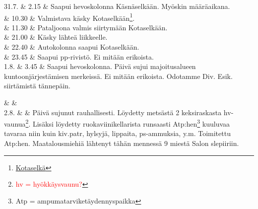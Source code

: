 \documentclass[11pt,a5paper,oneside]{book}
\begin{document}
\taulustop


31.7. & 2.15 & Saapui hevoskolonna Käsnäselkään. Myöskin määräaikana. \newline \\

& 10.30 & Valmistava käsky Kotaselkään\footnote{\href{https://www.google.fi/maps/place/61\%C2\%B031'09.9\%22N+32\%C2\%B033'31.8\%22E/}{Kotaselkä}}. \\

& 11.30 & Pataljoona valmis siirtymään Kotaselkään. \newline \\

& 21.00 & Käsky lähteä liikkeelle. \\

& 22.40 & Autokolonna saapui Kotaselkään. \\

& 23.45 & Saapui pp-rivistö. \newline Ei mitään erikoista. \newline\newline\newline\newline\newline\newline \\

1.8. & 3.45 & Saapui hevoskolonna. \newline Päivä sujui majoitusalueen kuntoonjärjestämisen merkeissä. Ei mitään erikoista. Odotamme Div. Esik. siirtämistä tännepäin. \\
\newpage

& & \newline\newline\newline \\

2.8. & & Päivä sujunut rauhallisesti. \newline Löydetty metsästä 2 keksiraskasta hv-vaunua\footnote{\textcolor{red}{hv = hyökkäysvaunu?}}. Lisäksi löydetty ruokaviinikellarista runsaasti Atp:hen\footnote{Atp = ampumatarviketäydennyspaikka} kuuluvaa tavaraa niin kuin kiv.patr, hylsyjä, lippaita, ps-ammuksia, y.m. Toimitettu Atp:hen. \newline Maatalousmiehiä lähtenyt tähän mennessä 9 miestä Salon slepiiriin. \\
\end{document}
